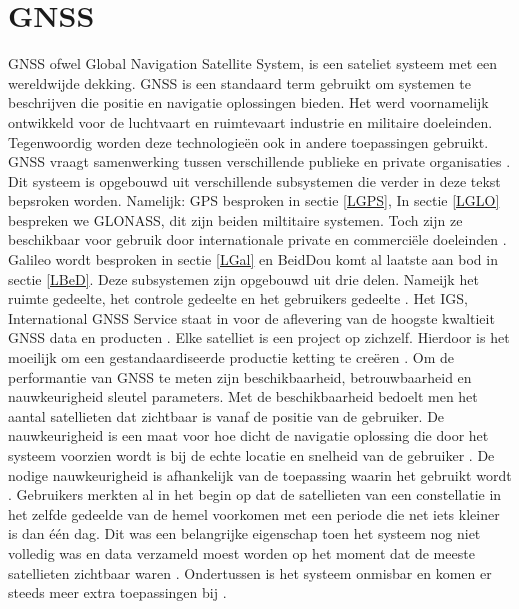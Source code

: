 \section{GNSS}
\label{LGNS}
GNSS ofwel Global Navigation Satellite System, is een sateliet systeem met een wereldwijde dekking. GNSS is een standaard term gebruikt om systemen te beschrijven die positie en navigatie oplossingen bieden. Het werd voornamelijk ontwikkeld voor de luchtvaart en ruimtevaart industrie en militaire doeleinden. Tegenwoordig worden deze technologie\"en ook in andere toepassingen gebruikt. GNSS vraagt samenwerking tussen verschillende publieke en private organisaties \cite{LBibGNSS3}.  Dit systeem is opgebouwd uit verschillende subsystemen die verder in deze tekst bepsroken worden. Namelijk: GPS besproken in sectie \ref{LGPS}, In sectie \ref{LGLO} bespreken we GLONASS, dit zijn beiden miltitaire systemen. Toch zijn ze beschikbaar voor gebruik door internationale private en commerci\"ele doeleinden \cite{LBibGNSS8}. Galileo wordt besproken in sectie \ref{LGal} en BeidDou komt al laatste aan bod in sectie \ref{LBeD}. Deze subsystemen zijn opgebouwd uit drie delen. Nameijk het ruimte gedeelte, het controle gedeelte en het gebruikers gedeelte \cite{LBibBeiDou2}.  Het IGS, International GNSS Service staat in voor de aflevering van de hoogste kwaltieit GNSS data en producten \cite{LBibGNSS}. Elke satelliet is een project op zichzelf. Hierdoor is het moeilijk om een gestandaardiseerde productie ketting te creëren \cite{LBibGNSS3}. Om de performantie van GNSS te meten zijn beschikbaarheid, betrouwbaarheid en nauwkeurigheid sleutel parameters. Met de beschikbaarheid bedoelt men het aantal satellieten dat zichtbaar is vanaf de positie van de gebruiker. De nauwkeurigheid is een maat voor hoe dicht de navigatie oplossing die door het systeem voorzien wordt is bij de echte locatie en snelheid van de gebruiker \cite{LBibGNSS6}. De nodige nauwkeurigheid is afhankelijk van de toepassing waarin het gebruikt wordt \cite{LBibRTK3}. Gebruikers merkten al in het begin op dat de satellieten van een constellatie in het zelfde gedeelde van de hemel voorkomen met een periode die net iets kleiner is dan \'e\'en dag. Dit was een belangrijke eigenschap toen het systeem nog niet volledig was en data verzameld moest worden op het moment dat de meeste satellieten zichtbaar waren \cite{LBibGNSS7}. Ondertussen is het systeem onmisbar en komen er steeds meer extra toepassingen bij \cite{LBibGNSS8}.

